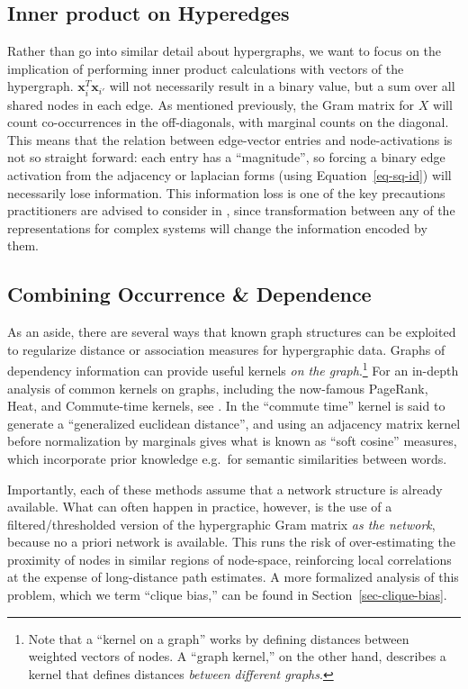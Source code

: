\documentclass[%
	12pt,
		oneside,
		letterpaper
]{book}
\begin{document}
\subsection{Inner product on
Hyperedges}\label{inner-product-on-hyperedges}

Rather than go into similar detail about hypergraphs, we want to focus
on the implication of performing inner product calculations with vectors
of the hypergraph. \(\mathbf{x}_i^T\mathbf{x}_{i'}\) will not
necessarily result in a binary value, but a sum over all shared nodes in
each edge. As mentioned previously, the Gram matrix for \(X\) will count
co-occurrences in the off-diagonals, with marginal counts on the
diagonal. This means that the relation between edge-vector entries and
node-activations is not so straight forward: each entry has a
``magnitude'', so forcing a binary edge activation from the adjacency or
laplacian forms (using Equation~\ref{eq-sq-id}) will necessarily lose
information. This information loss is one of the key precautions
practitioners are advised to consider in
\textcite{WhyHowWhen_Torres2021}, since transformation between any of
the representations for complex systems will change the information
encoded by them.

\subsection{Combining Occurrence \&
Dependence}\label{combining-occurrence-dependence}

As an aside, there are several ways that known graph structures can be
exploited to regularize distance or association measures for
hypergraphic data. Graphs of dependency information can provide useful
kernels \emph{on the graph}.\footnote{ Note that a ``kernel on a graph''
  works by defining distances between weighted vectors of nodes. A
  ``graph kernel,'' on the other hand, describes a kernel that defines
  distances \emph{between different graphs}.} For an in-depth analysis
of common kernels on graphs, including the now-famous PageRank, Heat,
and Commute-time kernels, see
\textcite{SimilaritiesgraphsKernels_Avrachenkov2019}. In
\textcite{GeneralizedEuclideanmeasure_Coscia2020} the ``commute time''
kernel is said to generate a ``generalized euclidean distance'', and
using an adjacency matrix kernel before normalization by marginals gives
what is known as ``soft cosine'' measures, which incorporate prior
knowledge e.g.~for semantic similarities between words.

Importantly, each of these methods assume that a network structure is
already available. What can often happen in practice, however, is the
use of a filtered/thresholded version of the hypergraphic Gram matrix
\emph{as the network}, because no a priori network is available. This
runs the risk of over-estimating the proximity of nodes in similar
regions of node-space, reinforcing local correlations at the expense of
long-distance path estimates. A more formalized analysis of this
problem, which we term ``clique bias,'' can be found in
Section~\ref{sec-clique-bias}.
\end{document}
